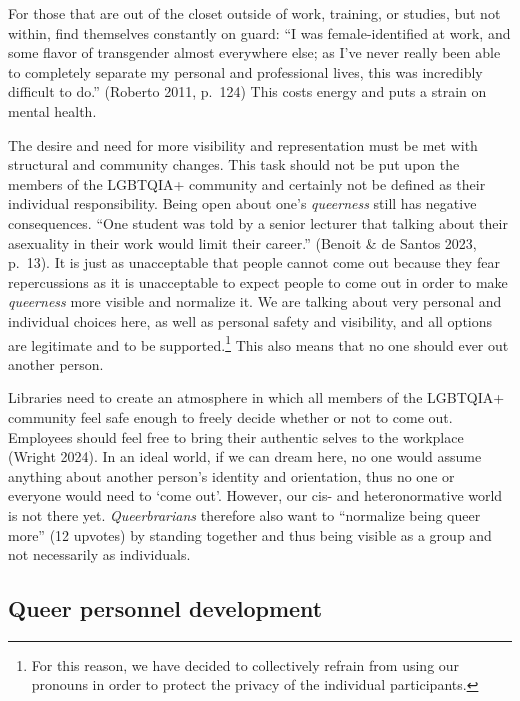 \documentclass[a4paper,
fontsize=11pt,
oneside,
numbers=noperiodatend,
parskip=half-,
bibliography=totoc,
final
]{scrartcl}
\begin{document}
For those that are out of the closet outside of work, training, or
studies, but not within, find themselves constantly on guard: \enquote{I was
female-identified at work, and some flavor of transgender almost
everywhere else; as I've never really been able to
completely separate my personal and professional lives, this was
incredibly difficult to do.} (Roberto 2011, p.~124) This costs energy
and puts a strain on mental health.

The desire and need for more visibility and representation must be met
with structural and community changes. This task should not be put upon
the members of the LGBTQIA+ community and certainly not be defined as
their individual responsibility. Being open about one's
\emph{queerness} still has negative consequences. \enquote{One student was told
by a senior lecturer that talking about their asexuality in their work
would limit their career.} (Benoit \& de Santos 2023, p.~13). It is just
as unacceptable that people cannot come out because they fear
repercussions as it is unacceptable to expect people to come out in
order to make \emph{queerness} more visible and normalize it. We are
talking about very personal and individual choices here, as well as
personal safety and visibility, and all options are legitimate and to be
supported.\footnote{For this reason, we have decided to collectively
  refrain from using our pronouns in order to protect the privacy of the
  individual participants.} This also means that no one should ever out
another person.

Libraries need to create an atmosphere in which all members of the
LGBTQIA+ community feel safe enough to freely decide whether or not to
come out. Employees should feel free to bring their authentic selves to
the workplace (Wright 2024). In an ideal world, if we can dream here, no
one would assume anything about another person's
identity and orientation, thus no one or everyone would need to
\enquote*{come out}. However, our cis- and heteronormative world is not
there yet. \emph{Queerbrarians} therefore also want to \enquote{normalize being
queer more} (12 upvotes) by standing together and thus being visible as
a group and not necessarily as individuals.

\hypertarget{queer-personnel-development}{%
\subsection{Queer personnel
development}\label{queer-personnel-development}}
\end{document}
